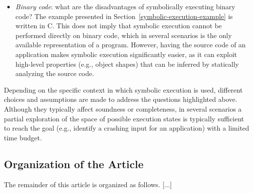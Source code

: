 \begin{itemize}
  \item {\em Binary code}: what are the disadvantages of symbolically executing binary code?
  The example presented in Section~\ref{symbolic-execution-example} is written in C. This does not imply that symbolic execution cannot be performed directly on binary code, which in several scenarios is the only available representation of a program. However, having the source code of an application makes symbolic execution significantly easier, as it can exploit high-level properties (e.g., object shapes) that can be inferred by statically analyzing the source code.
   
\end{itemize}
Depending on the specific context in which symbolic execution is used, different choices and assumptions are made to address the questions highlighted above. Although they typically affect soundness or completeness, in several scenarios a partial exploration of the space of possible execution states is typically sufficient to reach the goal (e.g., identify a crashing input for an application) with a limited time budget.


\subsection{Organization of the Article}

The remainder of this article is organized as follows. [...]

